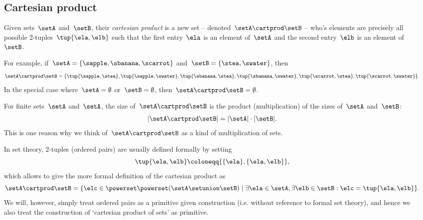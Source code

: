 \subsection{Cartesian product}\label{sec:cartesian-product}

Given sets~$\setA$ and~$\setB$, their \emph{cartesian product} is a new set -- denoted~$\setA \cartprod \setB$ -- who's elements are precisely all possible 2-tuples~$\tup{\ela, \elb}$ such that the first entry~$\ela$ is an element of~$\setA$ and the second entry~$\elb$ is an element of~$\setB$.

For example, if~$\setA = \{ \sapple, \sbanana, \scarrot\}$ and~$\setB = \{ \stea, \swater \}$, then
\begin{equation*}
    \setA \cartprod \setB = \{ \tup{\sapple, \stea}, \tup{\sapple, \swater}, \tup{\sbanana, \stea}, \tup{\sbanana, \swater},  \tup{\scarrot, \stea}, \tup{\scarrot, \swater}\}.
\end{equation*}
In the special case where~$\setA = \emptyset$ or~$\setB = \emptyset$, then~$\setA \cartprod \setB = \emptyset$.

\begin{remark}
    For finite sets~$\setA$ and~$\setA$, the size of~$\setA \cartprod \setB$ is the product (multiplication) of the sizes of~$\setA$ and~$\setB$:
    \begin{equation*}
        \vert \setA \cartprod \setB \vert = \vert \setA \vert \cdot \vert \setB \vert.
    \end{equation*}
    This is one reason why we think of~$\setA \cartprod \setB$ as a kind of multiplication of sets.
\end{remark}

In set theory, 2-tuples (ordered pairs) are usually defined formally by setting
\begin{equation}
    \label{eq:ordered-pair}
    \tup{\ela, \elb} \coloneqq \{ \{\ela \} , \{ \ela, \elb \} \},
\end{equation}
which allows to give the more formal definition of the cartesian product as
\begin{equation}
    \setA \cartprod \setB = \{ \elc \in \powerset \powerset (\setA \setunion \setB) \mid \exists \ela \in \setA, \exists \elb \in \setB : \elc = \tup{\ela, \elb} \}.
\end{equation}
We will, however, simply treat ordered pairs as a primitive given construction (i.e. without reference to formal set theory), and hence we also treat the construction of `cartesian product of sets' as primitive.

